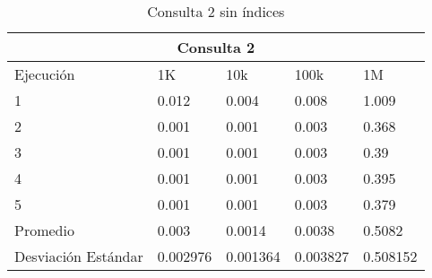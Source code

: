 \begin{table}%
\begin{center}%
\setlength{\tabcolsep}{0.3in}%
\begin{tabular}{|l|l|l|l|l|}%
\hline%
\multicolumn{5}{|c|}{Consulta 2}\\%
\hline%
Ejecución&1K&10k&100k&1M\\%
\hline%
1&0.012&0.004&0.008&1.009\\%
\hline%
2&0.001&0.001&0.003&0.368\\%
\hline%
3&0.001&0.001&0.003&0.39\\%
\hline%
4&0.001&0.001&0.003&0.395\\%
\hline%
5&0.001&0.001&0.003&0.379\\%
\hline%
Promedio&0.003&0.0014&0.0038&0.5082\\%
\hline%
Desviación Estándar&0.002976&0.001364&0.003827&0.508152\\%
\hline%
\end{tabular}%
\end{center}%
\caption{Consulta 2 sin índices}%
\end{table}